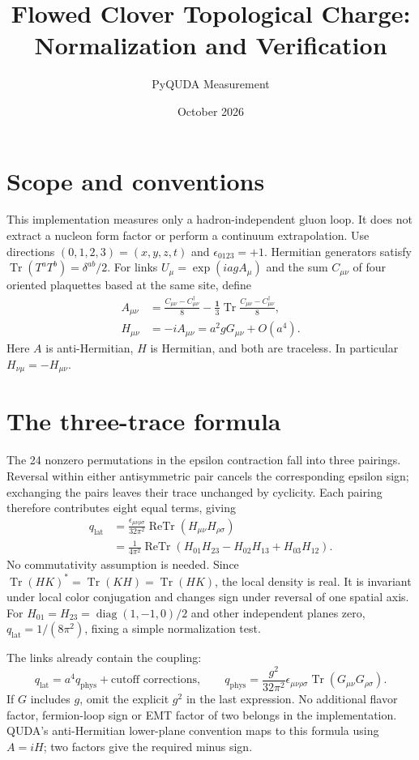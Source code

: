 \documentclass[11pt,a4paper]{article}
\title{Flowed Clover Topological Charge: Normalization and Verification}
\author{PyQUDA Measurement}
\date{October 2026}
\begin{document}
\maketitle
\section{Scope and conventions}
This implementation measures only a hadron-independent gluon loop. It does
not extract a nucleon form factor or perform a continuum extrapolation.
Use directions $(0,1,2,3)=(x,y,z,t)$ and $\epsilon_{0123}=+1$.
Hermitian generators satisfy $\operatorname{Tr}(T^aT^b)=\delta^{ab}/2$.
For links $U_\mu=\exp(iag A_\mu)$ and the sum $C_{\mu\nu}$ of four oriented
plaquettes based at the same site, define
\begin{align}
 A_{\mu\nu}&=\frac{C_{\mu\nu}-C_{\mu\nu}^\dagger}{8}
 -\frac{\mathbf1}{3}\operatorname{Tr}\frac{C_{\mu\nu}-C_{\mu\nu}^\dagger}{8},\\
 H_{\mu\nu}&=-iA_{\mu\nu}=a^2gG_{\mu\nu}+O(a^4).
\end{align}
Here $A$ is anti-Hermitian, $H$ is Hermitian, and both are traceless.
In particular $H_{\nu\mu}=-H_{\mu\nu}$.

\section{The three-trace formula}
The 24 nonzero permutations in the epsilon contraction fall into three
pairings. Reversal within either antisymmetric pair cancels the corresponding
epsilon sign; exchanging the pairs leaves their trace unchanged by cyclicity.
Each pairing therefore contributes eight equal terms, giving
\begin{align}
 q_{\mathrm{lat}}
 &=\frac{\epsilon_{\mu\nu\rho\sigma}}{32\pi^2}
    \operatorname{ReTr}(H_{\mu\nu}H_{\rho\sigma})\\
 &=\frac1{4\pi^2}\operatorname{ReTr}
    (H_{01}H_{23}-H_{02}H_{13}+H_{03}H_{12}).
\end{align}
No commutativity assumption is needed. Since
$\operatorname{Tr}(HK)^*=\operatorname{Tr}(KH)=\operatorname{Tr}(HK)$,
the local density is real. It is invariant under local color conjugation and
changes sign under reversal of one spatial axis. For $H_{01}=H_{23}
=\operatorname{diag}(1,-1,0)/2$ and other independent planes zero,
$q_{\mathrm{lat}}=1/(8\pi^2)$, fixing a simple normalization test.

The links already contain the coupling:
\begin{equation}
 q_{\mathrm{lat}}=a^4q_{\mathrm{phys}}+\text{cutoff corrections},\qquad
 q_{\mathrm{phys}}=\frac{g^2}{32\pi^2}
 \epsilon_{\mu\nu\rho\sigma}\operatorname{Tr}(G_{\mu\nu}G_{\rho\sigma}).
\end{equation}
If $G$ includes $g$, omit the explicit $g^2$ in the last expression.
No additional flavor factor, fermion-loop sign or EMT factor of two belongs
in the implementation. QUDA's anti-Hermitian lower-plane convention maps to
this formula using $A=iH$; two factors give the required minus sign.
\end{document}
